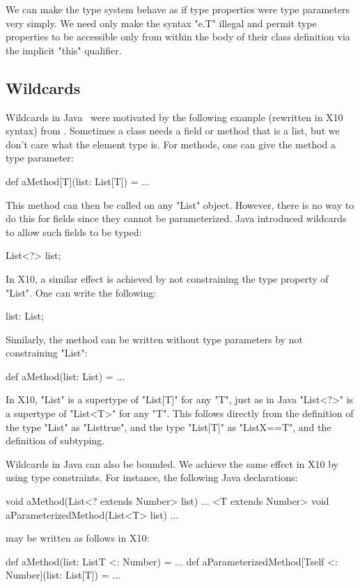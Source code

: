 \documentclass{llncs}
\begin{document}
We can make the type system behave as if type properties were
type parameters very simply.  We need only make the syntax \xcd"e.T"
illegal and permit type properties to be accessible only
from within the body of their class definition via the implicit \xcd"this"
qualifier.

\subsection{Wildcards}

Wildcards in Java~\cite{Java3,adding-wildcards} were motivated
by the following example (rewritten in X10 syntax)
from \cite{adding-wildcards}.
Sometimes a class needs a field or method
that is a list, but we don't care what the element type is.
For methods, one can give the method a type parameter:
\begin{xten}
def aMethod[T](list: List[T]) = { ... }
\end{xten}
This method can then be called on any \xcd"List" object.
However, there is no way to do this for fields since they
cannot be parameterized.
Java introduced wildcards to allow such fields to be 
typed:
\begin{xten}
List<?> list;
\end{xten}
In X10, a similar effect is achieved by not constraining the
type property of \xcd"List".
One can write the following:
\begin{xten}
list: List;
\end{xten}
Similarly, the method can be written without type parameters by
not constraining \xcd"List":
\begin{xten}
def aMethod(list: List) = { ... }
\end{xten}

In X10, \xcd"List"
is a supertype of
\xcd"List[T]" for any \xcd"T",
just as in Java
\xcd"List<?>" is a supertype of
\xcd"List<T>" for any \xcd"T".
This follows directly from the definition of the type \xcd"List"
as \xcd"List{true}", and the type \xcd"List[T]"
as \xcd"List{X==T}", and the definition of subtyping.

Wildcards in Java can also be bounded.
We achieve the same
effect in X10 by using type constraints.
For instance, the following Java declarations:
\begin{xten}
void aMethod(List<? extends Number> list) { ... }
<T extends Number> void aParameterizedMethod(List<T> list) { ... }
\end{xten}
may be written as follows in X10:
\begin{xten}
def aMethod(list: List{T <: Number}) = { ... }
def aParameterizedMethod[T{self <: Number}](list: List[T]) = { ... }
\end{xten}
\end{document}
